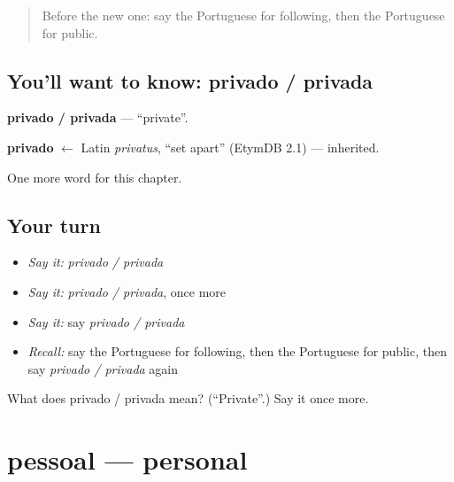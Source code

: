 \label{lesson:PT-C156-privado-privada}



\begin{quote}
Before the new one: say the Portuguese for following, then the Portuguese for public.
\end{quote}

\subsection*{You'll want to know: privado / privada}
\textbf{privado / privada} — \textquotedblleft{}private\textquotedblright{}.

\begin{cousinweb}
\textbf{privado} $\leftarrow$ Latin \emph{privatus}, \textquotedblleft{}set apart\textquotedblright{} (EtymDB 2.1) — inherited.
\end{cousinweb}

\begin{grammarlens}[title={What you've built}]
One more word for this chapter.
\end{grammarlens}

\subsection*{Your turn}
\begin{itemize}
\raggedright
  \item \emph{Say it:} \emph{privado / privada}
  \item \emph{Say it:} \emph{privado / privada}, once more
  \item \emph{Say it:} say \emph{privado / privada}
  \item \emph{Recall:} say the Portuguese for following, then the Portuguese for public, then say \emph{privado / privada} again
\end{itemize}

\begin{tcolorbox}[breakable,colback=teal!4,colframe=teal!35!black,title={Before you move on}]
What does privado / privada mean? (\textquotedblleft{}Private\textquotedblright{}.) Say it once more.
\end{tcolorbox}
\section[pessoal]{pessoal — personal}

\label{lesson:PT-C156-pessoal}



